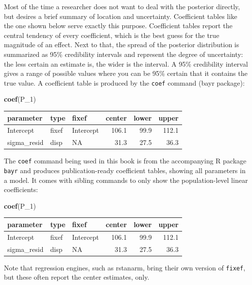 \documentclass[]{svmono}
\newenvironment{Shaded}{\begin{snugshade}}{\end{snugshade}}
\newcommand{\KeywordTok}[1]{\textcolor[rgb]{0.13,0.29,0.53}{\textbf{#1}}}
\newcommand{\DecValTok}[1]{\textcolor[rgb]{0.00,0.00,0.81}{#1}}
\newcommand{\NormalTok}[1]{#1}
\begin{document}
Most of the time a researcher does not want to deal with the posterior
directly, but desires a brief summary of location and uncertainty.
Coefficient tables like the one shown below serve exactly this purpose.
Coefficient tables report the central tendency of every coefficient,
which is the best guess for the true magnitude of an effect. Next to
that, the spread of the posterior distribution is summarized as 95\%
credibility intervals and represent the degree of uncertainty: the less
certain an estimate is, the wider is the interval. A 95\% credibility
interval gives a range of possible values where you can be 95\% certain
that it contains the true value. A coefficient table is produced by the
\texttt{coef} command (bayr package):

\begin{Shaded}
\begin{Highlighting}[]
\KeywordTok{coef}\NormalTok{(P_}\DecValTok{1}\NormalTok{)}
\end{Highlighting}
\end{Shaded}

\begin{longtable}[]{@{}lllrrr@{}}
\toprule
parameter & type & fixef & center & lower & upper\tabularnewline
\midrule
\endhead
Intercept & fixef & Intercept & 106.1 & 99.9 & 112.1\tabularnewline
sigma\_resid & disp & NA & 31.3 & 27.5 & 36.3\tabularnewline
\bottomrule
\end{longtable}

The \texttt{coef} command being used in this book is from the
accompanying R package \texttt{bayr} and produces publication-ready
coefficient tables, showing all parameters in a model. It comes with
sibling commands to only show the population-level linear coefficients:

\begin{Shaded}
\begin{Highlighting}[]
\KeywordTok{coef}\NormalTok{(P_}\DecValTok{1}\NormalTok{)}
\end{Highlighting}
\end{Shaded}

\begin{longtable}[]{@{}lllrrr@{}}
\toprule
parameter & type & fixef & center & lower & upper\tabularnewline
\midrule
\endhead
Intercept & fixef & Intercept & 106.1 & 99.9 & 112.1\tabularnewline
sigma\_resid & disp & NA & 31.3 & 27.5 & 36.3\tabularnewline
\bottomrule
\end{longtable}

Note that regression engines, such as rstanarm, bring their own version
of \texttt{fixef}, but these often report the center estimates, only.
\end{document}
